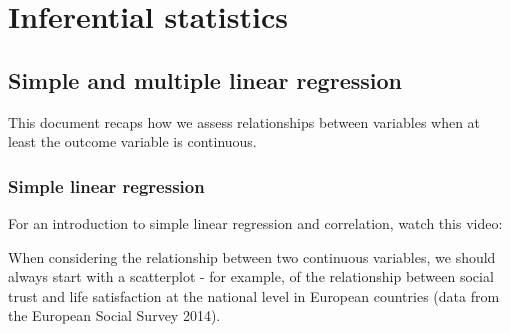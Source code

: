 \documentclass[
]{book}
\newenvironment{Shaded}{\begin{snugshade}}{\end{snugshade}}
\newcommand{\CommentTok}[1]{\textcolor[rgb]{0.56,0.35,0.01}{\textit{#1}}}
\newcommand{\DataTypeTok}[1]{\textcolor[rgb]{0.13,0.29,0.53}{#1}}
\newcommand{\DecValTok}[1]{\textcolor[rgb]{0.00,0.00,0.81}{#1}}
\newcommand{\KeywordTok}[1]{\textcolor[rgb]{0.13,0.29,0.53}{\textbf{#1}}}
\newcommand{\NormalTok}[1]{#1}
\newcommand{\OperatorTok}[1]{\textcolor[rgb]{0.81,0.36,0.00}{\textbf{#1}}}
\newcommand{\StringTok}[1]{\textcolor[rgb]{0.31,0.60,0.02}{#1}}
\begin{document}
\hypertarget{part-inferential-statistics}{%
\part*{Inferential statistics}\label{part-inferential-statistics}}

\hypertarget{simple-and-multiple-linear-regression}{%
\chapter{Simple and multiple linear regression}\label{simple-and-multiple-linear-regression}}

This document recaps how we assess relationships between variables when
at least the outcome variable is continuous.

\hypertarget{simple-linear-regression}{%
\section{Simple linear regression}\label{simple-linear-regression}}

For an introduction to simple linear regression and correlation, watch
this video:

When considering the relationship between two continuous variables, we
should always start with a scatterplot - for example, of the
relationship between social trust and life satisfaction at the national
level in European countries (data from the European Social Survey 2014).

\begin{Shaded}
\end{Shaded}
\end{document}
